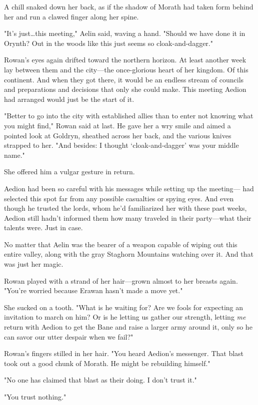 A chill snaked down her back, as if the shadow of Morath had taken form behind her and run a clawed finger along her spine.

"It's just\ldots this meeting," Aelin said, waving a hand.
"Should we have done it in Orynth?
Out in the woods like this just seems so cloak-and-dagger."

Rowan's eyes again drifted toward the northern horizon.
At least another week lay between them and the city---the once-glorious heart of her kingdom.
Of this continent.
And when they got there, it would be an endless stream of councils and preparations and decisions that only she could make.
This meeting Aedion had arranged would just be the start of it.

"Better to go into the city with established allies than to enter not knowing what you might find," Rowan said at last.
He gave her a wry smile and aimed a pointed look at Goldryn, sheathed across her back, and the various knives strapped to her.
"And besides: I thought `cloak-and-dagger' was your middle name."

She offered him a vulgar gesture in return.

Aedion had been so careful with his messages while setting up the meeting--- had selected this spot far from any possible casualties or spying eyes.
And even though he trusted the lords, whom he'd familiarized her with these past weeks, Aedion still hadn't informed them how many traveled in their party---what their talents were.
Just in case.

No matter that Aelin was the bearer of a weapon capable of wiping out this entire valley, along with the gray Staghorn Mountains watching over it.
And that was just her magic.

Rowan played with a strand of her hair---grown almost to her breasts again.
"You're worried because Erawan hasn't made a move yet."

She sucked on a tooth.
"What is he waiting for?
Are we fools for expecting an invitation to march on him?
Or is he letting us gather our strength, letting \emph{me} return with Aedion to get the Bane and raise a larger army around it, only so he can savor our utter despair when we fail?"

Rowan's fingers stilled in her hair.
"You heard Aedion's messenger.
That blast took out a good chunk of Morath.
He might be rebuilding himself."

"No one has claimed that blast as their doing.
I don't trust it."

"You trust nothing."

